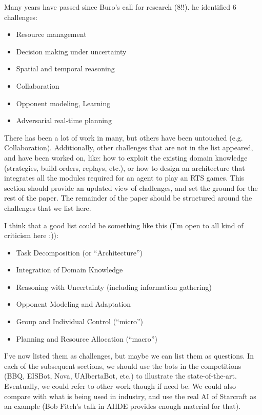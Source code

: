 \documentclass[journal]{IEEEtran}
\begin{document}
{\color{blue}
Many years have passed since Buro's call for research (8!!). he identified 6 challenges:
\begin{itemize}
\item Resource management
\item Decision making under uncertainty
\item Spatial and temporal reasoning
\item Collaboration
\item Opponent modeling, Learning
\item Adversarial real-time planning
\end{itemize}

There has been a lot of work in many, but others have been untouched (e.g. Collaboration). Additionally, other challenges that are not in the list appeared, and have been worked on, like: how to exploit the existing domain knowledge (strategies, build-orders, replays, etc.), or how to design an architecture that integrates all the modules required for an agent to play an RTS games. This section should provide an updated view of challenges, and set the ground for the rest of the paper. The remainder of the paper should be structured around the challenges that we list here.

I think that a good list could be something like this (I'm open to all kind of criticism here :)):

\begin{itemize}
\item Task Decomposition (or ``Architecture'')
\item Integration of Domain Knowledge
\item Reasoning with Uncertainty (including information gathering)
\item Opponent Modeling and Adaptation
\item Group and Individual Control (``micro'')
\item Planning and Resource Allocation (``macro'')
\end{itemize}

I've now listed them as challenges, but maybe we can list them as questions. In each of the subsequent sections, we should use the bots in the competitions (BBQ, EISBot, Nova, UAlbertaBot, etc.) to illustrate the state-of-the-art. Eventually, we could refer to other work though if need be. We could also compare with what is being used in industry, and use the real AI of Starcraft as an example (Bob Fitch's talk in AIIDE provides enough material for that).
}
\end{document}
